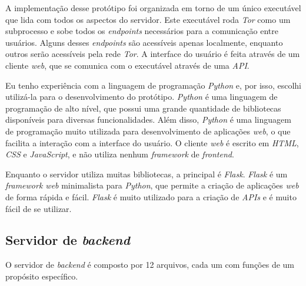 A implementação desse protótipo foi organizada em torno de um único executável que lida com todos os aspectos do servidor. Este executável roda \textit{Tor} como um subprocesso e sobe todos os \textit{endpoints} necessários para a comunicação entre usuários. Alguns desses \textit{endpoints} são acessíveis apenas localmente, enquanto outros serão acessíveis pela rede \textit{Tor}. A interface do usuário é feita através de um cliente \textit{web}, que se comunica com o executável através de uma \textit{API}.

Eu tenho experiência com a linguagem de programação \textit{Python} e, por isso, escolhi utilizá-la para o desenvolvimento do protótipo. \textit{Python} é uma linguagem de programação de alto nível, que possui uma grande quantidade de bibliotecas disponíveis para diversas funcionalidades. Além disso, \textit{Python} é uma linguagem de programação muito utilizada para desenvolvimento de aplicações \textit{web}, o que facilita a interação com a interface do usuário. O cliente \textit{web} é escrito em \textit{HTML}, \textit{CSS} e \textit{JavaScript}, e não utiliza nenhum \textit{framework} de \textit{frontend}.

Enquanto o servidor utiliza muitas bibliotecas, a principal é \textit{Flask}. \textit{Flask} é um \textit{framework web} minimalista para \textit{Python}, que permite a criação de aplicações \textit{web} de forma rápida e fácil. \textit{Flask} é muito utilizado para a criação de \textit{APIs} e é muito fácil de se utilizar.

\subsection{Servidor de \textit{backend}}

O servidor de \textit{backend} é composto por 12 arquivos, cada um com funções de um propósito específico.

